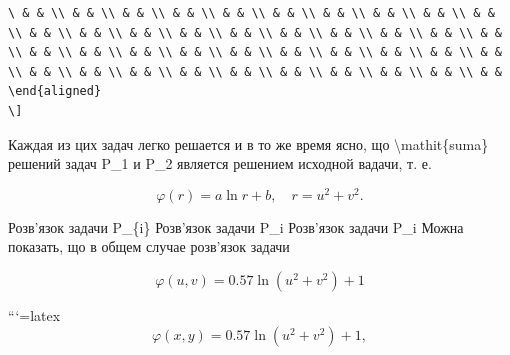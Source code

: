 \documentclass[
]{article}
\begin{document}
\begin{verbatim}
\ & & \\ & & \\ & & \\ & & \\ & & \\ & & \\ & & \\ & & \\ & & \\ & & \\ & & \\ & & \\ & & \\ & & \\ & & \\ & & \\ & & \\ & & \\ & & \\ & & \\ & & \\ & & \\ & & \\ & & \\ & & \\ & & \\ & & \\ & & \\ & & \\ & & \\ & & \\ & & \\ & & \\ & & \\ & & \\ & & \\ & & \\ & & \\ & & \\ & & \end{aligned}
\]
\end{verbatim}

Каждая из цих задач легко решается и в то же время ясно, що
\textbackslash mathit\{suma\} решений задач P\_1 и P\_2 является
решением исходной вадачи, т. е.

\[
\varphi(r) = a \ln r + b, \quad r = u^2 + v^2.
\]

Розв'язок задачи P\_\{i\} Розв'язок задачи P\_i Розв'язок задачи P\_i
Можна показать, що в общем случае розв'язок задачи

\[
\varphi(u, v) = 0.57 \ln(u^2 + v^2) + 1
\]

```{=latex}
\[
\varphi(x, y) = 0.57 \ln(u^2 + v^2) + 1,
\]
\end{document}
